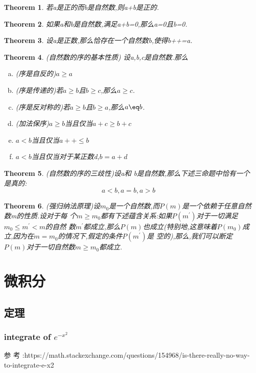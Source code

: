 \documentclass[UTF-8]{ctexart}
\newtheorem{theorem}{Theorem}[section]
\begin{document}
\begin{theorem}
若a是正的而b是自然数,则a+b是正的.
\end{theorem}

\begin{theorem}
如果a和b是自然数,满足a+b=0,那么a=0且b=0.
\end{theorem}

\begin{theorem}
设a是正数,那么恰存在一个自然数b,使得b++=a.
\end{theorem}

\begin{theorem}
  (自然数的序的基本性质) 设a,b,c是自然数.那么
\begin{enumerate}[(a)]
\item (序是自反的)$a\geq a$
\item (序是传递的)若$a \geq b$且$b \geq c$,那么$a \geq c$.
\item (序是反对称的)若$a \geq b$且$b \geq a$,那么$a \eq b$.
\item (加法保序)$a \geq b$当且仅当$a+c \geq b+c$
\item $a < b $当且仅当$a++ \leq b$
\item $a < b $当且仅当对于某正数d,$b=a+d$
\end{enumerate}
\end{theorem}

\begin{theorem}
  (自然数的序的三歧性)设a和
  b是自然数,那么下述三命题中恰有一个是真的:
  $$a<b,a=b,a>b$$
\end{theorem}

\begin{theorem}
(强归纳法原理)设$m_0$是一个自然数,而$P(m)$是一个依赖于任意自然数m的性质.设对于每
个$m \geq m_0$都有下述蕴含关系:如果$P(m^')$对于一切满足$m_0 \leq m^{'}  < m$的自然
数$m^'$都成立,那么$P(m
)$也成立(特别地,这意味着$P(m_0)$成立,因为在$m=m_0$的情况下,假定的条件$P(m^')$是
空的),那么,我们可以断定$P(m)$对于一切自然数$m \geq m_0$都成立.
\end{theorem}

\newpage
\section{微积分}
\subsection{定理}
\subsubsection{integrate of $e^{-x^2}$}
参
考
:https://math.stackexchange.com/questions/154968/is-there-really-no-way-to-integrate-e-x2
\end{document}
